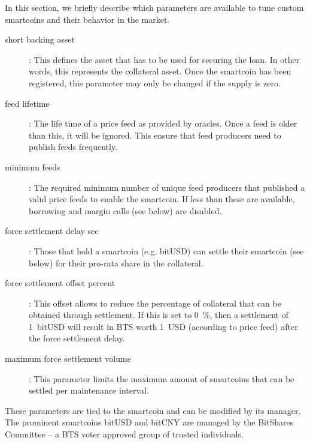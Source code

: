 In this section, we briefly describe which parameters are available to tune
custom smartcoins and their behavior in the market.

\begin{description}
 \item[short backing asset]: This defines the asset that has to be used for
       securing the loan. In other words, this represents the collateral asset.
       Once the smartcoin has been registered, this parameter may only be
       changed if the supply is zero.
 \item[feed lifetime]: The life time of a price feed as provided by oracles.
       Once a feed is older than this, it will be ignored. This ensure that
       feed producers need to publish feeds frequently.
 \item[minimum feeds]: The required minimum number of unique feed producers that
       published a valid price feeds to enable the smartcoin. If less than
       these are available, borrowing and margin calls (see below) are
       disabled.
 \item[force settlement delay sec]: Those that hold a smartcoin (e.g. bitUSD)
       can settle their smartcoin (see below) for their pro-rata share in the
       collateral.
 \item[force settlement offset percent]: This offset allows to reduce the
       percentage of collateral that can be obtained through settlement.
       If this is set to \SI{0}{\percent}, then a settlement of \SI{1}{bitUSD}
       will result in BTS worth \SI{1}{USD} (according to price feed) after the
       force settlement delay.
 \item[maximum force settlement volume]: This parameter limits the maximum
       amount of smartcoins that can be settled per maintenance interval.
\end{description}

These parameters are tied to the smartcoin and can be modified by its manager.
The prominent smartcoins bitUSD and bitCNY are managed by the BitShares
Committee -- a BTS voter approved group of trusted individuals.
